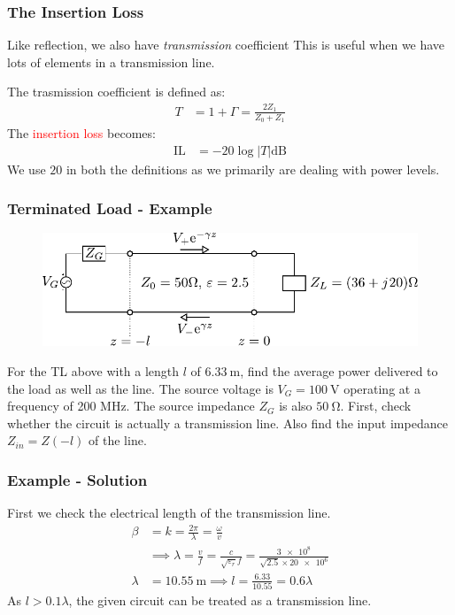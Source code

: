 \documentclass[10pt, compress]{beamer}
\renewcommand{\O}{\omega}  %
\newcommand{\E}{\varepsilon}  %
\begin{document}
\begin{frame}
  \frametitle{The Insertion Loss}
  \begin{outline}
    \1 Like reflection, we also have \textit{transmission} coefficient
    \1 This is useful when we have lots of elements in a transmission line.
  \end{outline}
The trasmission coefficient is defined as:
\begin{align*}
  T &= 1 + \Gamma = \frac{2 Z_{1}}{{Z_{0}} + {Z_{1}}}
\end{align*}
The \textcolor{red}{insertion loss} becomes:
\begin{align*}
  \mathrm{IL} &= -20 \log |T| \mathrm{dB}
\end{align*}
We use $20$ in both the definitions as we primarily are dealing with power levels.

\end{frame}

\begin{frame}
  \frametitle{Terminated Load - Example}
\begin{figure}[t!]
  \centering
  \includegraphics[width=.9\textwidth]{tline_terminated_example.pdf}
\end{figure}
  For the TL above with a length $l$ of $\SI{6.33}{\m}$, find the average power delivered to the load as well as the line. The source voltage is $V_G = \SI{100}{\volt}$ operating at a frequency of 200 MHz. The source impedance $Z_G$ is also $\SI{50}{\ohm}$. First, check whether the circuit is actually a transmission line. Also find the input impedance $Z_{in} = Z(-l)$ of the line.
\end{frame}

\begin{frame}
  \frametitle{Example - Solution}
First we check the electrical length of the transmission line.
  \begin{align*}
    \beta &= k = \frac{2 \pi}{\lambda} = \frac{\O}{v} \\
    & \implies \lambda = \frac{v}{f} = \frac{c}{\sqrt{\E_r} f} = \frac{\num{3e8}}{\sqrt{2.5} \times \num{20e6}} \\
    \lambda &= \SI{10.55}{\m} \implies l = \frac{6.33}{10.55} = 0.6 \lambda
  \end{align*}
As $l > 0.1 \lambda$, the given circuit can be treated as a transmission line.
\end{frame}
\end{document}
